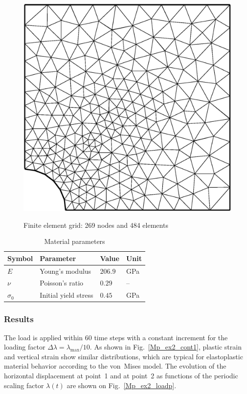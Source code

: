 \begin{figure}[!htb]
\centering
    \includegraphics[scale=0.3]{PART_II/M/ex1_mesh_gfem.eps}\\
   \caption{Finite element grid: 269 nodes and 484 elements}
  \label{Mp_ex1_mesh}
\end{figure}

\begin{table}[!htb]
\centering
\caption{Material parameters}
\label{Mp_ex1_table1}
\begin{tabular}{llll}
\toprule
Symbol & Parameter & Value & Unit \\
\midrule
$E$        & Young's modulus      & $206.9$ & GPa \\
$\nu$      & Poisson's ratio      & $0.29$  & --  \\
$\sigma_0$ & Initial yield stress & $0.45$  & GPa \\
\bottomrule
\end{tabular}
\end{table}

\subsubsection{Results}
\label{subsubsec:Mp1_res}

The load is applied within 60 time steps with a constant increment for the loading factor $\Delta\lambda=\lambda_{\mathrm{max}}/10$. As shown in Fig.~\ref{Mp_ex2_cont1}, plastic strain and vertical strain show similar distributions, which are typical for elastoplastic material behavior according to the von~Mises model. The evolution of the horizontal displacement at point~1 and at point~2 as functions of the periodic scaling factor $\lambda (t)$ are shown on Fig.~\ref{Mp_ex2_loadp}.

